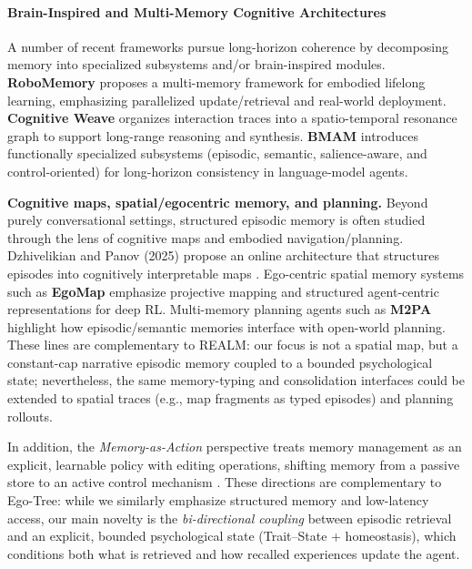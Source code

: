 \documentclass{article}
\begin{document}
\paragraph{Brain-Inspired and Multi-Memory Cognitive Architectures}
A number of recent frameworks pursue long-horizon coherence by decomposing memory into specialized subsystems and/or brain-inspired modules. \textbf{RoboMemory} \cite{lei2025robomemory} proposes a multi-memory framework for embodied lifelong learning, emphasizing parallelized update/retrieval and real-world deployment. \textbf{Cognitive Weave} \cite{vishwakarma2025cognitiveweave} organizes interaction traces into a spatio-temporal resonance graph to support long-range reasoning and synthesis. \textbf{BMAM} \cite{li2026bmam} introduces functionally specialized subsystems (episodic, semantic, salience-aware, and control-oriented) for long-horizon consistency in language-model agents.

\textbf{Cognitive maps, spatial/egocentric memory, and planning.}
Beyond purely conversational settings, structured episodic memory is often studied through the lens of cognitive maps and embodied navigation/planning. Dzhivelikian and Panov (2025) propose an online architecture that structures episodes into cognitively interpretable maps \cite{dzhivelikian2025cognitivemaps}. Ego-centric spatial memory systems such as \textbf{EgoMap} \cite{egomap2021} emphasize projective mapping and structured agent-centric representations for deep RL. Multi-memory planning agents such as \textbf{M2PA} \cite{m2pa2025} highlight how episodic/semantic memories interface with open-world planning. These lines are complementary to REALM: our focus is not a spatial map, but a constant-cap narrative episodic memory coupled to a bounded psychological state; nevertheless, the same memory-typing and consolidation interfaces could be extended to spatial traces (e.g., map fragments as typed episodes) and planning rollouts.

In addition, the \textit{Memory-as-Action} perspective treats memory management as an explicit, learnable policy with editing operations, shifting memory from a passive store to an active control mechanism \cite{zhang2025memoryasaction}. These directions are complementary to Ego-Tree: while we similarly emphasize structured memory and low-latency access, our main novelty is the \emph{bi-directional coupling} between episodic retrieval and an explicit, bounded psychological state (Trait--State + homeostasis), which conditions both what is retrieved and how recalled experiences update the agent.
\end{document}
